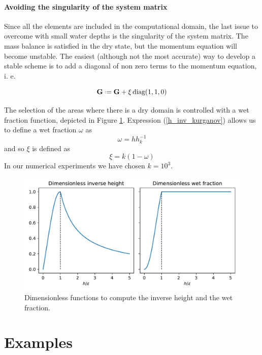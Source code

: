 \documentclass[a4paper,12pt]{article}
\newcommand\IgnasiCorregit[1]{\ifthenelse{\boolean{show_corregit}}{\textcolor{blue}{#1}}{}}
\newcommand{\defeq}{\mathrel{\vcenter{\baselineskip0.5ex\lineskiplimit0pt\hbox{\scriptsize.}\hbox{\scriptsize.}}}=}
\begin{document}
\paragraph{Avoiding the singularity of the system matrix}
Since all the elements are included in the computational domain, the last issue to overcome with small water depths is the singularity of the system matrix. The mass balance is satisfied in the dry state, but the momentum equation will become unstable. The easiest (although not the most accurate) way to develop a stable scheme is to add a diagonal of non zero terms to the momentum equation, i. e.

\begin{equation}
\mathbf{G} \defeq \mathbf{G} + \xi\,\text{diag}(1, 1, 0)
\end{equation}

The selection of the areas where there is a dry domain is controlled with a wet fraction function, depicted in Figure \ref{inverse_heihgt}. Expression (\ref{h_inv_kurganov}) allows us to define a wet fraction $\omega$ as
\begin{equation}
\omega = hh^{-1}_k
\end{equation}
and so $\xi$ is defined as \IgnasiCorregit{CREC QUE EL SIMBOL $\alpha$ JA L'HAVIES UTILITZAT ABANS}
\begin{equation}
\xi = k(1-\omega)
\end{equation}
In our numerical experiments we have chosen $k=10^3$.


\begin{figure}
    \centering
    \includegraphics[width=\textwidth]{img/fig/inverse_height.pdf}
    \caption{Dimensionless functions to compute the  inverse height and the wet fraction.}
    \label{inverse_heihgt}
\end{figure}


\section{Examples} \label{sec:examples}
\end{document}
